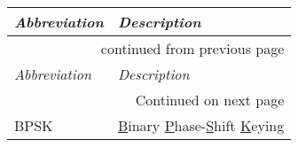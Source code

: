 



\vspace{0mm}
    \setlength\LTleft{0pt}
    \setlength\LTright{0pt}

\begin{longtable}{l @{\extracolsep\fill} p{} }
\toprule
{\itshape Abbreviation} & {\itshape Description} \\
\hline \hline
\endfirsthead
\hline \multicolumn{2}{r}{{continued from previous page}} \\ \hline
{\itshape Abbreviation} & {\itshape Description} \\
\hline
\endhead
\hline \multicolumn{2}{r}{{Continued on next page}} \\ \hline
\endfoot
\hline \hline
\endlastfoot


BPSK                    & \ul{B}inary \ul{P}hase-\ul{S}hift \ul{K}eying \\

\end{longtable}

